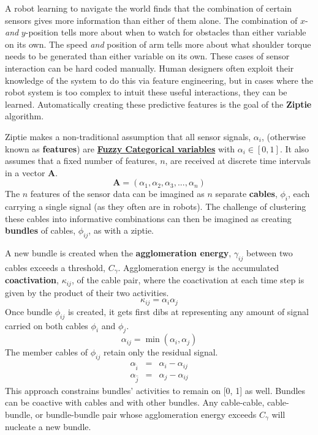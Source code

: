 \label{sec:intro}

A robot learning to navigate the world finds that the
combination of
certain sensors gives more information than either of them alone.
The combination of $x$- \textit{and} $y$-position tells more about
when to watch for obstacles than either variable on its own.
The speed \textit{and} position of arm tells more about what shoulder
torque needs to be generated than either variable on its own.
These cases
of sensor interaction can be hard coded manually. Human designers
often exploit their knowledge of the system to do this
via feature engineering,
but in cases where the robot system is too complex
to intuit these useful interactions, they can be learned.
Automatically creating these predictive features is the goal of 
the \textbf{Ziptie} algorithm.

Ziptie makes a non-traditional assumption that all sensor signals,
$\alpha_i$, (otherwise known as \textbf{features}) are
\textbf{\hyperref[sec:fuzzy]{Fuzzy Categorical variables}} with
$\alpha_i \in [0, 1]$. It also assumes that
a fixed number of features, $n$, are
received at discrete time intervals in a vector $\mathbf{A}$.
\begin{equation}
\mathbf{A} = (\alpha_1, \alpha_2, \alpha_3, ..., \alpha_n)
\end{equation}
The $n$ features of the sensor data
can be imagined as $n$ separate 
\textbf{cables}, $\phi_i$, each carrying a single signal
(as they often are in robots). The
challenge of clustering these cables into informative combinations
can then be imagined as creating \textbf{bundles} of cables, $\phi_{ij}$,
as with a ziptie.

A new bundle is created when the \textbf{agglomeration energy},
$\gamma_{ij}$
between two cables exceeds a threshold, $C_\gamma$. Agglomeration energy is the
accumulated \textbf{coactivation}, $\kappa_{ij}$, of the cable pair, where the
coactivation at each time step is given by the product of their two
activities.
\begin{equation}
\kappa_{ij} = \alpha_i \alpha_j
\end{equation}
Once bundle $\phi_{ij}$ is created, it gets first dibs at representing any
amount of signal carried on both cables $\phi_i$
and $\phi_j$.
\begin{equation}
\alpha_{ij} = \min(\alpha_i, \alpha_j)
\end{equation}
The member cables of $\phi_{ij}$  retain only the residual signal.
\begin{eqnarray}
\alpha_{\hat{i}} &=& \alpha_i - \alpha_{ij}\\
\alpha_{\hat{j}} &=& \alpha_j - \alpha_{ij}
\end{eqnarray}
This approach constrains bundles' activities to remain on [0, 1] as well.
Bundles can be coactive with cables and with other bundles.
Any cable-cable, cable-bundle, or bundle-bundle pair whose
agglomeration energy exceeds $C_\gamma$ will nucleate
a new bundle.

